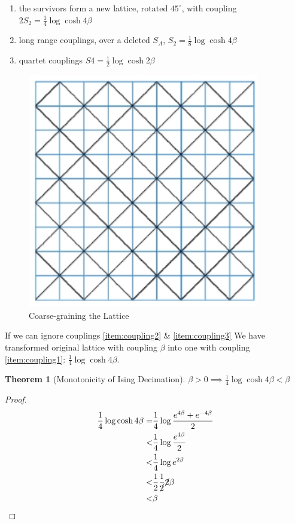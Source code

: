 \documentclass[]{article}
\newtheorem{thm}{Theorem}
\begin{document}
\begin{enumerate}
	\item the survivors form a new lattice, rotated $45^\circ$, with coupling $2S_2=\frac{1}{4} \log{\cosh{4 \beta}}$\label{item:coupling1}
	\item long range couplings, over a deleted $S_A$,  $S_2=\frac{1}{8} \log{\cosh{4 \beta}}$\label{item:coupling2}
	\item quartet couplings $S4=\frac{1}{2} \log{\cosh{2\beta}}$\label{item:coupling3}
\end{enumerate}

\begin{figure}[H]
	\caption{Coarse-graining the Lattice}\label{fig:ising-decimation}
	\includegraphics[width=0.9\textwidth]{isinng-decimation}
\end{figure}

If we can ignore couplings \ref{item:coupling2} \& \ref{item:coupling3} We have transformed original lattice with coupling $\beta$ into one with coupling \ref{item:coupling1}: $\frac{1}{4} \log{\cosh{4\beta}}$.

\begin{thm}[Monotonicity of Ising Decimation]
	$\beta > 0 \implies \frac{1}{4} \log{\cosh{4\beta}} < \beta$
\end{thm}

\begin{proof}
	\begin{align*}
	\frac{1}{4} \log{\cosh{4\beta}} =& \frac{1}{4} \log{\frac{e^{4\beta} + e^{- 4 \beta}}{2}}\\
	<&  \frac{1}{4} \log{\frac{e^{4\beta} }{2}}\\
	<& \frac{1}{4} \log{e^{2\beta} } \\
	<& \frac{1}{2} \frac{1}{\cancel{2}} \cancel{2} \beta\\
	<& \beta
	\end{align*}
\end{proof}
\end{document}
